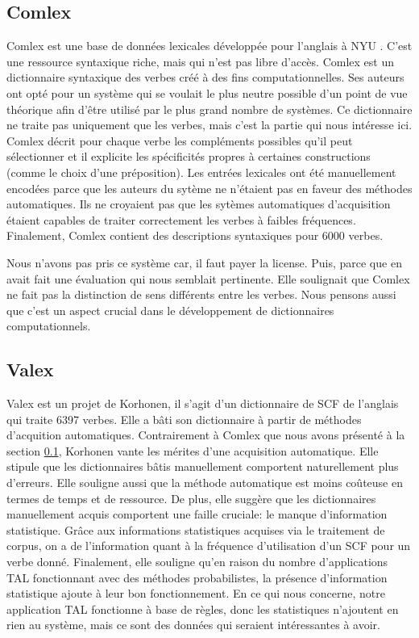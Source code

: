 \subsection{Comlex}\label{comlex}

Comlex est une base de données lexicales développée pour l'anglais à NYU \citep{Grishman:1994:CSB:991886.991931}. C'est une ressource syntaxique riche, mais qui n'est pas libre d'accès. Comlex est un dictionnaire syntaxique des verbes créé à des fins computationnelles. Ses auteurs ont opté pour un système qui se voulait le plus neutre possible d'un point de vue théorique afin d'être utilisé par le plus grand nombre de systèmes. Ce dictionnaire ne traite pas uniquement que les verbes, mais c'est la partie qui nous intéresse ici. Comlex décrit pour chaque verbe les compléments possibles qu'il peut sélectionner et il explicite les spécificités propres à certaines constructions (comme le choix d'une préposition). Les entrées lexicales ont été manuellement encodées parce que les auteurs du sytème ne n'étaient pas en faveur des méthodes automatiques. Ils ne croyaient pas que les sytèmes automatiques d'acquisition étaient capables de traiter correctement les verbes à faibles fréquences. Finalement, Comlex contient des descriptions syntaxiques pour 6000 verbes. 

Nous n'avons pas pris ce système car, il faut payer la license. Puis, parce que \cite{SchulerVerbnetBroadcoverageComprehensive2005} en avait fait une évaluation qui nous semblait pertinente. Elle soulignait que Comlex ne fait pas la distinction de sens différents entre les verbes. Nous pensons aussi que c'est un aspect crucial dans le développement de dictionnaires computationnels.

\subsection{Valex}
 
Valex est un projet de Korhonen, il s'agit d'un dictionnaire de \acf{SCF} de l'anglais \citep{Korhonenlargesubcategorizationlexicon2006} qui traite 6397 verbes. Elle a bâti son dictionnaire à partir de méthodes d'acquition automatiques. Contrairement à Comlex que nous avons présenté à la section \ref{comlex}, Korhonen vante les mérites d'une acquisition automatique. Elle stipule que les dictionnaires bâtis manuellement comportent naturellement plus d'erreurs. Elle souligne aussi que la méthode automatique est moins coûteuse en termes de temps et de ressource. De plus, elle suggère que les dictionnaires manuellement acquis comportent une faille cruciale: le manque d'information statistique. Grâce aux informations statistiques acquises via le traitement de corpus, on a de l'information quant à la fréquence d'utilisation d'un \ac{SCF} pour un verbe donné. Finalement, elle souligne qu'en raison du nombre d'applications \ac{TAL} fonctionnant avec des méthodes probabilistes, la présence d'information statistique ajoute à leur bon fonctionnement. En ce qui nous concerne, notre application \ac{TAL} fonctionne à base de règles, donc les statistiques n'ajoutent en rien au système, mais ce sont des données qui seraient intéressantes à avoir. 

